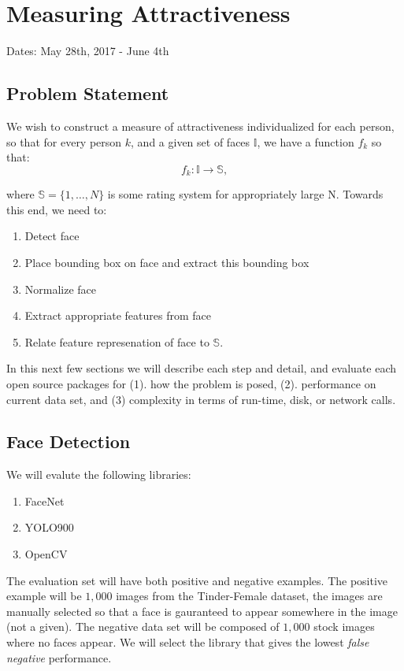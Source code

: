 \section{Measuring Attractiveness}

Dates: May 28th,  2017 - June 4th


\subsection{Problem Statement}

We wish to construct a measure of attractiveness individualized for each person, so that for every person $k$, and a given set of faces $\mathbb{I}$, we have a function $f_k$ so that:
	\[
		f_k : \mathbb{I} \rightarrow \mathbb{S},
	\]

where $\mathbb{S} = \{1,\ldots,N\}$ is some rating system for appropriately large N. Towards this end, we need to:

\begin{enumerate}
	\item Detect face
	\item Place bounding box on face and extract this bounding box
	\item Normalize face
	\item Extract appropriate features from face 
	\item Relate feature represenation of face to $\mathbb{S}$.
\end{enumerate}

In this next few sections we will describe each step and detail, and evaluate each open source packages for (1). how the problem is posed, (2). performance on current data set, and (3) complexity in terms of run-time, disk, or network calls. 

\subsection{Face Detection}

We will evalute the following libraries:

\begin{enumerate}
	\item FaceNet
	\item YOLO900
	\item OpenCV
\end{enumerate}

The evaluation set will have both positive and negative examples. The positive example will be $1,000$ images from the Tinder-Female dataset, the images are manually selected so that a face is gauranteed to appear somewhere in the image (not a given). The negative data set will be composed of $1,000$ stock images where no faces appear. We will select the library that gives the lowest \textit{false negative} performance.


